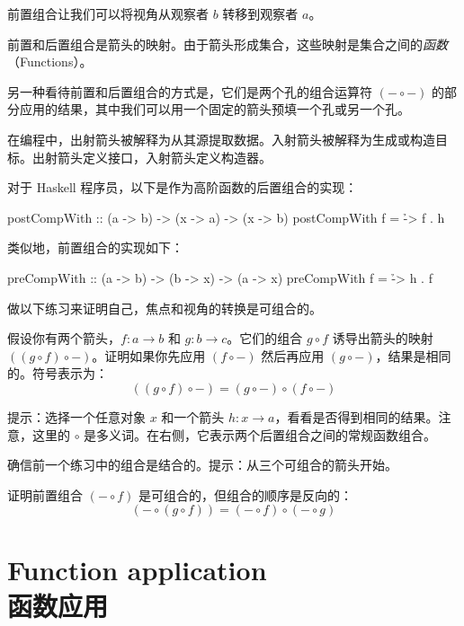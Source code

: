 \documentclass[DaoFP]{subfiles}
\begin{document}
    前置组合让我们可以将视角从观察者 $b$ 转移到观察者 $a$。

    前置和后置组合是箭头的映射。由于箭头形成集合，这些映射是集合之间的\emph{函数}（Functions）。

    另一种看待前置和后置组合的方式是，它们是两个孔的组合运算符 $(- \circ -)$ 的部分应用的结果，其中我们可以用一个固定的箭头预填一个孔或另一个孔。

    在编程中，出射箭头被解释为从其源提取数据。入射箭头被解释为生成或构造目标。出射箭头定义接口，入射箭头定义构造器。

    对于 Haskell 程序员，以下是作为高阶函数的后置组合的实现：
    \begin{haskell}
        postCompWith :: (a -> b) -> (x -> a) -> (x -> b)
        postCompWith f = \h -> f . h
    \end{haskell}
    类似地，前置组合的实现如下：
    \begin{haskell}
        preCompWith :: (a -> b) -> (b -> x) -> (a -> x)
        preCompWith f = \h -> h . f
    \end{haskell}

    做以下练习来证明自己，焦点和视角的转换是可组合的。
    \begin{exercise}\label{ex-yoneda-composition}
    假设你有两个箭头，$f \colon a \to b$ 和 $g \colon b \to c$。它们的组合 $g \circ f$ 诱导出箭头的映射 $((g \circ f) \circ -)$。证明如果你先应用 $(f \circ -)$ 然后再应用 $(g \circ -)$，结果是相同的。符号表示为：
    \[((g \circ f) \circ -) = (g \circ -) \circ (f \circ -)\]

    提示：选择一个任意对象 $x$ 和一个箭头 $h \colon x \to a$，看看是否得到相同的结果。注意，这里的 $\circ$ 是多义词。在右侧，它表示两个后置组合之间的常规函数组合。
    \end{exercise}

    \begin{exercise}
        确信前一个练习中的组合是结合的。提示：从三个可组合的箭头开始。
    \end{exercise}

    \begin{exercise}
        证明前置组合 $(- \circ f)$ 是可组合的，但组合的顺序是反向的：
        \[(- \circ (g \circ f)) = (- \circ f) \circ (- \circ g) \]
    \end{exercise}

    \section{Function application\\函数应用}
\end{document}
